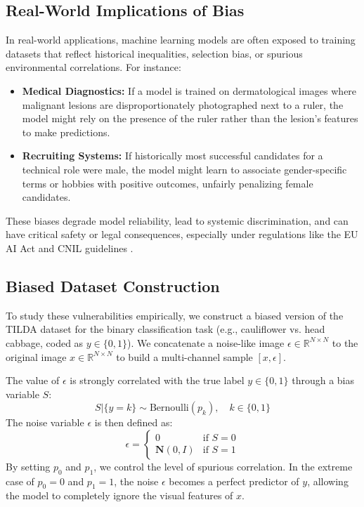 \documentclass{name}
\begin{document}
\subsection{Real-World Implications of Bias}
In real-world applications, machine learning models are often exposed to training datasets that reflect historical inequalities, selection bias, or spurious environmental correlations. For instance:
\begin{itemize}
    \item \textbf{Medical Diagnostics:} If a model is trained on dermatological images where malignant lesions are disproportionately photographed next to a ruler, the model might rely on the presence of the ruler rather than the lesion's features to make predictions.
    \item \textbf{Recruiting Systems:} If historically most successful candidates for a technical role were male, the model might learn to associate gender-specific terms or hobbies with positive outcomes, unfairly penalizing female candidates.
\end{itemize}
These biases degrade model reliability, lead to systemic discrimination, and can have critical safety or legal consequences, especially under regulations like the EU AI Act \cite{besse2022european} and CNIL guidelines \cite{cnil2026guide}.

\subsection{Biased Dataset Construction}
To study these vulnerabilities empirically, we construct a biased version of the TILDA dataset for the binary classification task (e.g., cauliflower vs. head cabbage, coded as $y \in \{0, 1\}$). We concatenate a noise-like image $\epsilon \in \mathbb{R}^{N \times N}$ to the original image $x \in \mathbb{R}^{N \times N}$ to build a multi-channel sample $[x, \epsilon]$.

The value of $\epsilon$ is strongly correlated with the true label $y \in \{0, 1\}$ through a bias variable $S$:
\begin{equation}
    S | \{y = k\} \sim \text{Bernoulli}(p_k), \quad k \in \{0, 1\}
\end{equation}
The noise variable $\epsilon$ is then defined as:
\begin{equation}
    \epsilon = \begin{cases} 
        0 & \text{if } S = 0 \\ 
        \mathbf{N}(0, I) & \text{if } S = 1 
    \end{cases}
\end{equation}
By setting $p_0$ and $p_1$, we control the level of spurious correlation. In the extreme case of $p_0 = 0$ and $p_1 = 1$, the noise $\epsilon$ becomes a perfect predictor of $y$, allowing the model to completely ignore the visual features of $x$.
\end{document}
